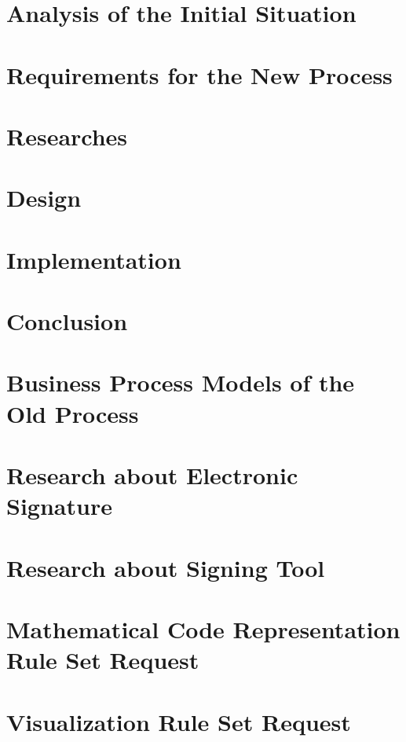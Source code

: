 	\chapter{Analysis of the Initial Situation}
	\label{ch:analysis}
	
	
	\chapter{Requirements for the New Process}
	
	
	\chapter{Researches}
	
	
	\chapter{Design}
	
	
	\chapter{Implementation}
	
	
	\chapter{Conclusion}
	
	
	\printbibliography
	
	\clearpage
	\appendix
	\chapter{Business Process Models of the Old Process}
	\label{bpmnOld}
	
	
	\chapter{Research about Electronic Signature}
	\label{res:es}
	
	
	\chapter{Research about Signing Tool}
	\label{res:tool}
	
	
	\chapter{Mathematical Code Representation Rule Set Request}
	\label{mathCode}
		
	
	\chapter{Visualization Rule Set Request}
	\label{visuRuleset}
	
